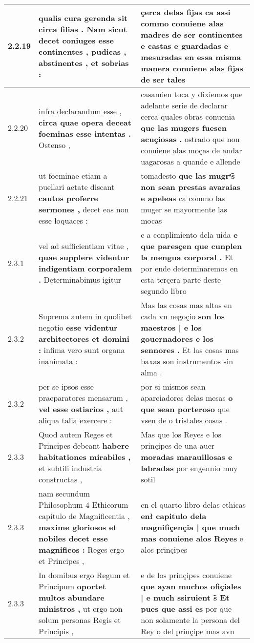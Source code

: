 \begin{tabular}{|p{1cm}|p{6.5cm}|p{6.5cm}|}
2.2.19 & qualis cura gerenda sit circa filias . \textbf{ Nam sicut decet coniuges esse continentes , } pudicas , abstinentes , et sobrias : & çerca delas fijas \textbf{ ca assi commo conuiene alas madres } de ser continentes e castas e guardadas e mesuradas en essa misma manera conuiene alas fijas de ser tales \\\hline
2.2.20 & infra declarandum esse , \textbf{ circa quae opera deceat foeminas esse intentas . } Ostenso , & casamien toca y dixiemos que adelante serie de declarar cerca quales obras conuenia \textbf{ que las mugers fuesen acuçiosas . } ostrado que non conuiene alas moças de andar uagarosas a quande e allende \\\hline
2.2.21 & ut foeminae etiam a puellari aetate discant \textbf{ cautos proferre sermones , } decet eas non esse loquaces : & tomadesto \textbf{ que las mugrͣ̃s non sean prestas avaraias e apeleas } ca commo las muger se mayormente las mocas \\\hline
2.3.1 & vel ad sufficientiam vitae , \textbf{ quae supplere videntur indigentiam corporalem . } Determinabimus igitur & e a conplimiento dela uida \textbf{ e que paresçen que cunplen la mengua corporal . } Et por ende determinaremos en esta terçera parte deste segundo libro \\\hline
2.3.2 & Suprema autem in quolibet negotio \textbf{ esse videntur architectores et domini : } infima vero sunt organa inanimata : & Mas las cosas mas altas en cada vn negoçio \textbf{ son los maestros | e los gouernadores e los sennores . } Et las cosas mas baxas son instrumentos sin alma . \\\hline
2.3.2 & per se ipsos esse praeparatores mensarum , \textbf{ vel esse ostiarios , } aut aliqua talia exercere : & por si mismos sean apareiadores delas mesas \textbf{ o que sean porteroso } que vsen de o tristales cosas . \\\hline
2.3.3 & Quod autem Reges et Principes debeant \textbf{ habere habitationes mirabiles , } et subtili industria constructas , & Mas que los Reyes e los prinçipes de una auer \textbf{ moradas marauillosas e labradas } por engennio muy sotil \\\hline
2.3.3 & nam secundum Philosophum 4 Ethicorum capitulo de Magnificentia , \textbf{ maxime gloriosos et nobiles decet esse magnificos : } Reges ergo et Principes , & en el quarto libro delas ethicas \textbf{ enł capitulo dela magnifiçençia | que much mas conuiene alos Reyes } e alos prinçipes \\\hline
2.3.3 & In domibus ergo Regum et Principum \textbf{ oportet multos abundare ministros , } ut ergo non solum personas Regis et Principis , & e de los prinçipes conuiene \textbf{ que ayan muchos ofiçiales | e much ssiruient s̃ Et pues que assi es } por que non solamente la persona del Rey o del prinçipe mas avn \\\hline

\end{tabular}
